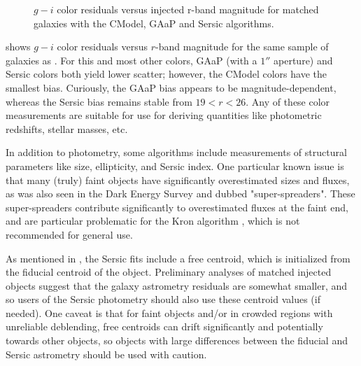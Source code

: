 \begin{figure}[htb]
\caption{$g-i$ color residuals versus injected r-band magnitude for matched galaxies with the CModel, \gls{GAaP} and Sersic algorithms.}
\label{fig:injected_lsst_cells_v1_5063_r_color_g_minus_i}
\vspace{0.1cm}
\end{figure}

 shows $g-i$ color residuals versus $r$-band magnitude for the same sample of galaxies as .
For this and most other colors, \gls{GAaP} (with a $1''$ aperture) and Sersic colors both yield lower scatter; however, the CModel colors have the smallest bias.
Curiously, the \gls{GAaP} bias appears to be magnitude-dependent, whereas the Sersic bias remains stable from $19<r<26$.
Any of these color measurements are suitable for use for deriving quantities like photometric redshifts, stellar masses, etc.

In addition to photometry, some algorithms include measurements of structural parameters like size, ellipticity, and Sersic index.
One particular known issue is that many (truly) faint objects have significantly overestimated sizes and fluxes, as was also seen in the Dark Energy Survey \citep{2025arXiv250105739B} and dubbed "super-spreaders".
These super-spreaders contribute significantly to overestimated fluxes at the faint end, and are particular problematic for the Kron algorithm \citep{1980ApJS...43..305K}, which is not recommended for general use.

As mentioned in , the Sersic fits include a free centroid, which is initialized from the fiducial centroid of the object.
Preliminary analyses of matched injected objects suggest that the galaxy \gls{astrometry} residuals are somewhat smaller, and so users of the Sersic photometry should also use these centroid values (if needed).
One caveat is that for faint objects and/or in crowded regions with unreliable deblending, free centroids can drift significantly and potentially towards other objects, so objects with large differences between the fiducial and Sersic \gls{astrometry} should be used with caution.

